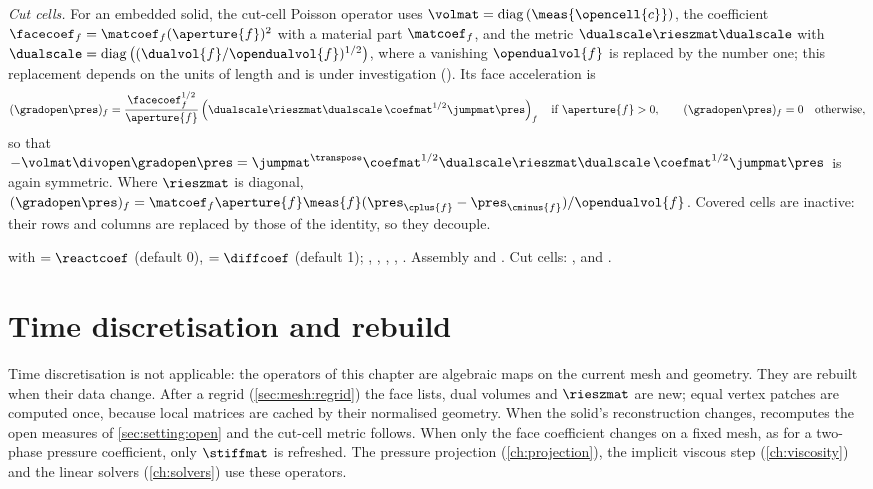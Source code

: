 \emph{Cut cells.} For an embedded solid, the cut-cell Poisson operator uses
$\volmat=\diag{\meas{\opencell{c}}}$, the coefficient
$\facecoef_f=\matcoef_f(\aperture{f})^2$ with a material part $\matcoef_f$,
and the metric $\dualscale\rieszmat\dualscale$ with
$\dualscale=\diag{(\dualvol{f}/\opendualvol{f})^{1/2}}$, where a vanishing
$\opendualvol{f}$ is replaced by the number one; this replacement depends on
the units of length and is under investigation
().
Its face acceleration is
\begin{equation}\label{eq:setting:cut-gradient}
  (\gradopen\pres)_f=\frac{\facecoef_f^{1/2}}{\aperture{f}}
    \roundpar{\dualscale\rieszmat\dualscale\,\coefmat^{1/2}\jumpmat\pres}_f
  \quad\text{if }\aperture{f}>0,\qquad (\gradopen\pres)_f=0\quad\text{otherwise},
\end{equation}
so that $-\volmat\divopen\gradopen\pres
=\jumpmat^{\transpose}\coefmat^{1/2}\dualscale\rieszmat\dualscale\,\coefmat^{1/2}\jumpmat\pres$
is again symmetric. Where $\rieszmat$ is diagonal,
$(\gradopen\pres)_f=\matcoef_f\aperture{f}\meas{f}(\pres_{\cplus{f}}-\pres_{\cminus{f}})/\opendualvol{f}$.
Covered cells are inactive: their rows and columns are replaced by those of
the identity, so they decouple.

\begin{implnote}
 with 
$=\reactcoef$ (default 0),  $=\diffcoef$ (default 1);
, ,
, , .
Assembly  and
. Cut cells:
,
 and
.
\end{implnote}

\section{Time discretisation and rebuild}\label{sec:setting:time}
Time discretisation is not applicable: the operators of this chapter are
algebraic maps on the current mesh and geometry. They are rebuilt when their
data change. After a regrid (\cref{sec:mesh:regrid}) the face lists, dual
volumes and $\rieszmat$ are new; equal vertex patches are computed once,
because local matrices are cached by their normalised geometry. When the
solid's reconstruction changes,  recomputes the open
measures of \cref{sec:setting:open} and the cut-cell metric follows. When only
the face coefficient changes on a fixed mesh, as for a two-phase pressure
coefficient, only $\stiffmat$ is refreshed. The pressure projection
(\cref{ch:projection}), the implicit viscous step (\cref{ch:viscosity}) and
the linear solvers (\cref{ch:solvers}) use these operators.
